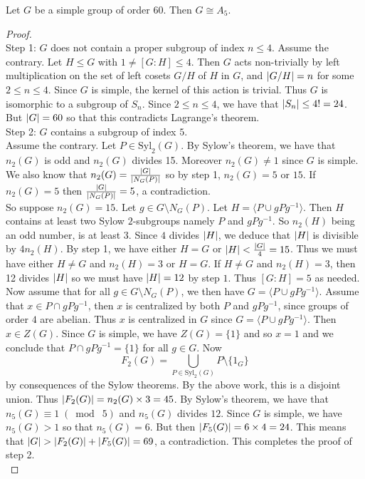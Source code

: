 \documentclass[a4paper]{article}
\begin{document}
\begin{thm}{}{} Let $G$ be a simple group of order $60$. Then $G\cong A_5$. 
\begin{proof}~\\
Step 1: $G$ does not contain a proper subgroup of index $n\leq 4$. 
Assume the contrary. Let $H\leq G$ with $1\neq[G:H]\leq 4$. Then $G$ acts non-trivially by left multiplication on the set of left cosets $G/H$ of $H$ in $G$, and $\abs{G/H}=n$ for some $2\leq n\leq 4$. Since $G$ is simple, the kernel of this action is trivial. Thus $G$ is isomorphic to a subgroup of $S_n$. Since $2\leq n\leq 4$, we have that $\abs{S_n}\leq 4!=24$. But $\abs{G}=60$ so that this contradicts Lagrange's theorem. \\

Step 2: $G$ contains a subgroup of index $5$. \\
Assume the contrary. Let $P\in\text{Syl}_2(G)$. By Sylow's theorem, we have that $n_2(G)$ is odd and $n_2(G)$ divides 15. Moreover $n_2(G)\neq 1$ since $G$ is simple. We also know that $n_2(G)=\frac{\abs{G}}{\abs{N_G(P)}}$ so by step 1, $n_2(G)=5$ or $15$. If $n_2(G)=5$ then $\frac{\abs{G}}{\abs{N_G(P)}}=5$, a contradiction. \\

So suppose $n_2(G)=15$. Let $g\in G\setminus N_G(P)$. Let $H=\langle P\cup gPg^{-1}\rangle$. Then $H$ contains at least two Sylow $2$-subgroups namely $P$ and $gPg^{-1}$. So $n_2(H)$ being an odd number, is at least $3$. Since $4$ divides $\abs{H}$, we deduce that $\abs{H}$ is divisible by $4n_2(H)$. By step 1, we have either $H=G$ or $\abs{H}<\frac{\abs{G}}{4}=15$. Thus we must have either $H\neq G$ and $n_2(H)=3$ or $H=G$. If $H\neq G$ and $n_2(H)=3$, then 12 divides $\abs{H}$ so we must have $\abs{H}=12$ by step $1$. Thus $[G:H]=5$ as needed. \\

Now assume that for all $g\in G\setminus N_G(P)$, we then have $G=\langle P\cup gPg^{-1}\rangle$. Assume that $x\in P\cap gPg^{-1}$, then $x$ is centralized by both $P$ and $gPg^{-1}$, since groups of order $4$ are abelian. Thus $x$ is centralized in $G$ since $G=\langle P\cup gPg^{-1}\rangle$. Then $x\in Z(G)$. Since $G$ is simple, we have $Z(G)=\{1\}$ and so $x=1$ and we conclude that $P\cap gPg^{-1}=\{1\}$ for all $g\in G$. Now $$F_2(G)=\bigcup_{P\in\text{Syl}_2(G)}P\setminus\{1_G\}$$ by consequences of the Sylow theorems. By the above work, this is a disjoint union. Thus $\abs{F_2(G)}=n_2(G)\times 3=45$. By Sylow's theorem, we have that $n_5(G)\equiv 1\;(\bmod\;5)$ and $n_5(G)$ divides $12$. Since $G$ is simple, we have $n_5(G)>1$ so that $n_5(G)=6$. But then $\abs{F_5(G)}=6\times 4=24$. This means that $\abs{G}>\abs{F_2(G)}+\abs{F_5(G)}=69$, a contradiction. This completes the proof of step 2. \\


\end{proof}
\end{thm}
\end{document}
